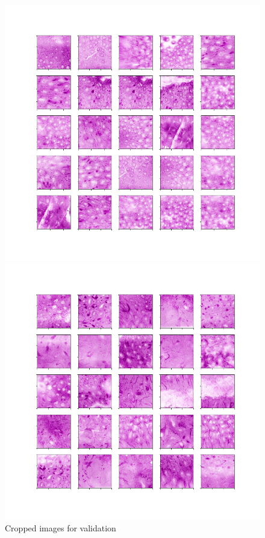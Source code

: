 \begin{figure}[H]
	\begin{minipage}{0.45\columnwidth}
		\centering
		\includegraphics[clip, width=\linewidth]{fig/preprocessing/cropping/HE/normal/C-012}
	\end{minipage}
	\begin{minipage}{0.45\columnwidth}
		\centering
		\includegraphics[clip, width=\linewidth]{fig/preprocessing/cropping/HE/cancer/C-012}
	\end{minipage}

	\caption{Cropped images for validation}
	\label{fig:クロップ}

\end{figure}

